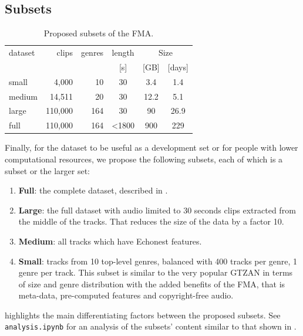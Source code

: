 \documentclass{article}
\begin{document}
\subsection{Subsets} \label{sec:subsets}

\begin{table}
	\centering
	\begin{tabular}{lrrccc}
		\toprule
		dataset & clips & genres & length & \multicolumn{2}{c}{Size} \\
		\cmidrule{5-6}
		        &         &          &  [s]   & [GB] & [days] \\
		\midrule
		small  &   4,000 & 10  & 30    & 3.4  & 1.4  \\
		medium &  14,511 & 20  & 30    & 12.2 & 5.1  \\
		large  & 110,000 & 164 & 30    & 90   & 26.9 \\
		full   & 110,000 & 164 & <1800 & 900  & 229  \\
		\bottomrule
	\end{tabular}
	\caption{Proposed subsets of the FMA.}
	\label{tab:subsets}
\end{table}

Finally, for the dataset to be useful as a development set or for people with lower computational resources, we propose the following subsets, each of which is a subset or the larger set:
\begin{enumerate}
	\item \textbf{Full}: the complete dataset, described in .
	\item \textbf{Large}: the full dataset with audio limited to 30 seconds clips extracted from the middle of the tracks. That reduces the size of the data by a factor 10.
	\item \textbf{Medium}: all tracks which have Echonest features.
	\item \textbf{Small}: tracks from 10 top-level genres, balanced with 400 tracks per genre, 1 genre per track. This subset is similar to the very popular GTZAN in terms of size and genre distribution with the added benefits of the FMA, that is meta-data, pre-computed features and copyright-free audio.
\end{enumerate}
 highlights the main differentiating factors between the proposed subsets. See \texttt{analysis.ipynb} for an analysis of the subsets' content similar to that shown in .


\end{document}
